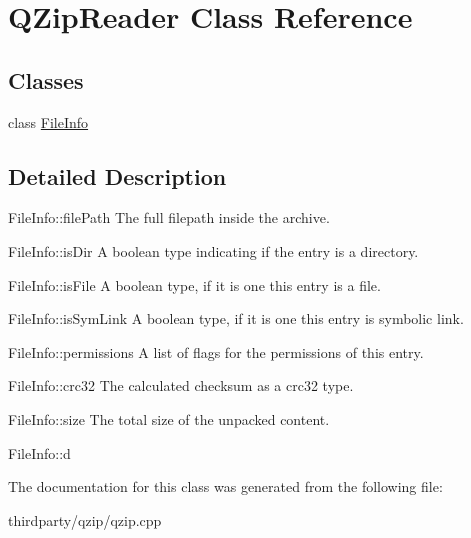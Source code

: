 \hypertarget{class_q_zip_reader}{}\section{Q\+Zip\+Reader Class Reference}
\label{class_q_zip_reader}
\subsection*{Classes}
\begin{DoxyCompactItemize}
\item 
class \hyperlink{class_q_zip_reader_1_1_file_info}{File\+Info}
\end{DoxyCompactItemize}


\subsection{Detailed Description}
File\+Info\+::file\+Path The full filepath inside the archive.

File\+Info\+::is\+Dir A boolean type indicating if the entry is a directory.

File\+Info\+::is\+File A boolean type, if it is one this entry is a file.

File\+Info\+::is\+Sym\+Link A boolean type, if it is one this entry is symbolic link.

File\+Info\+::permissions A list of flags for the permissions of this entry.

File\+Info\+::crc32 The calculated checksum as a crc32 type.

File\+Info\+::size The total size of the unpacked content.

File\+Info\+::d 

The documentation for this class was generated from the following file\+:\begin{DoxyCompactItemize}
\item 
thirdparty/qzip/qzip.\+cpp\end{DoxyCompactItemize}
